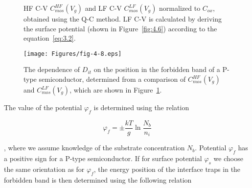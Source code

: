 \begin{figure}[h!]\centering
  \begin{minipage}[c]{\myfiguresize}
    \begin{center}
      
      \caption[HF C-V $C_{mos}^{HF} (V_{g})$ and LF C-V dependence
        $C_{mos}^{LF} (V_{g})$ normalized to $C_{ox}$, obtained using
        the Q-C method]{HF C-V $C_{mos}^{HF} (V_{g})$ and LF C-V
        $C_{mos}^{LF} (V_{g})$ normalized to $C_{ox}$, obtained using
        the Q-C method.  LF C-V is calculated by deriving the surface
        potential (shown in Figure~\ref{fig:4.6}) according to the
        equation~\ref{eq:3.2}.}\label{fig:4.7}
    \end{center}
  \end{minipage}
\end{figure}

\newpage
\begin{figure}[h!]\centering
  \begin{minipage}[c]{\myfiguresize}
    \begin{center}
      \texttt{[image: Figures/fig-4-8.eps]}
      \caption[Dependence of $D_{it}$ on the position in the forbidden
        band of the semiconductor of a P-type semiconductor,
        determined from the comparison of $C_{mos}^{HF} (V_{g})$ and
        $C_{mos}^{LF} (V_{g})$]{The dependence of $D_{it}$ on the
        position in the forbidden band of a P-type semiconductor,
        determined from a comparison of $C_{mos}^{HF} (V_{g})$ and
        $C_{mos}^{LF} (V_{g})$, which are shown in
        Figure~\ref{fig:4.7}.}\label{fig:4.8}
    \end{center}
  \end{minipage}
\end{figure}

The value of the potential $\varphi_{f}$ is determined using the relation

\begin{equation}\label{eq:4.16}
  \varphi_{f} = \pm \frac{kT}{g} \ln{\frac{N_{b}}{n_{i}}}
\end{equation}

, where we assume knowledge of the substrate concentration
$N_{b}$. Potential $\varphi_{f}$ has a positive sign for a P-type
semiconductor. If for surface potential $\varphi_{s}$ we choose the
same orientation as for $\varphi_{f}$, the energy position of the
interface traps in the forbidden band is then determined using the
following relation

